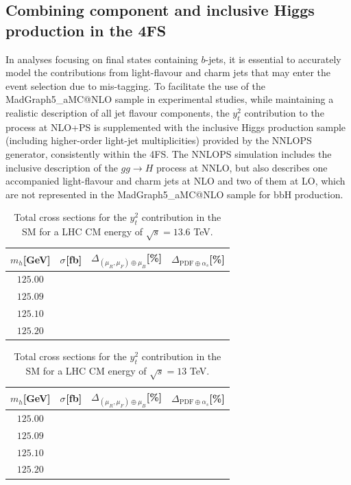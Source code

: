 \documentclass[11pt,a4paper]{article}
\begin{document}
\subsection{Combining  \bbH{} component and inclusive Higgs production in the 4FS}


In analyses focusing on final states containing $b$-jets, it is essential to accurately model the contributions 
from light-flavour and charm jets that may enter the event selection due to mis-tagging. 
To facilitate the use of the {\sc MadGraph5\_aMC@NLO} sample in experimental studies, 
while maintaining a realistic description of all jet flavour components, 
the $y_t^2$ contribution to the \bbH{} process at NLO+PS 
is supplemented with the inclusive Higgs production sample (including higher-order light-jet multiplicities) 
provided by the {\sc NNLOPS} generator, consistently within the 4FS.
The {\sc NNLOPS} simulation includes the inclusive description of the $gg \to H$ process at NNLO, but also describes 
one accompanied light-flavour and charm jets at NLO and two of them at LO, which are not represented in 
the {\sc MadGraph5\_aMC@NLO} sample for bbH{} production.


\begin{table}[t]
\begin{center}%
\begin{small}%
\begin{tabular}{cccc}%
$m_h$[GeV] & $\sigma^{}$[fb] & $\Delta_{\left(\mu_{R},\mu_{F}\right)\oplus\mu_{B}}$[\%] & $\Delta_{\mathrm{PDF}\oplus\alpha_s}$[\%]  \\\hline
$125.00$  \\
$125.09$ \\
$125.10$  \\
$125.20$ \\
\end{tabular}%
\end{small}%
\end{center}%
\caption{Total \bbH{} cross sections for the $y_t^2$ contribution in the SM for a LHC CM energy of $\sqrt{s}=13.6$ TeV.}
\label{tab:bbHyt13p6}
\end{table}


\begin{table}[b]
\begin{center}%
\begin{small}%
\begin{tabular}{cccc}%
$m_h$[GeV] & $\sigma^{}$[fb] & $\Delta_{\left(\mu_{R},\mu_{F}\right)\oplus\mu_{B}}$[\%] & $\Delta_{\mathrm{PDF}\oplus\alpha_s}$[\%]  \\\hline
$125.00$ \\
$125.09$\\
$125.10$  \\
$125.20$ \\
\end{tabular}%
\end{small}%
\end{center}%
\caption{Total \bbH{} cross sections for the $y_t^2$ contribution in the SM for a LHC CM energy of $\sqrt{s}=13$ TeV.}
\label{tab:bbHyt13}
\end{table}
\end{document}
